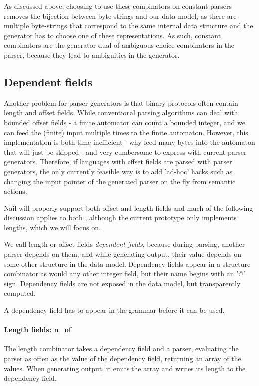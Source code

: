 As discussed above, choosing to use these combinators on constant parsers
removes the bijection between byte-strings and our data model, as there are
multiple byte-strings that correspond to the same internal data structure and
the generator has to choose one of these representations. As such, constant
combinators are the generator dual of ambiguous choice combinators in the
parser, because they lead to ambiguities in the generator.


\subsection{Dependent fields}
Another problem for parser generators is that binary protocols often contain
length and offset fields. While conventional parsing algorithms can deal with
bounded offset fields - a finite automaton can count a bounded integer, and we
can feed the (finite) input multiple times to the finite automaton. However,
this implementation is both time-inefficient - why feed many bytes into the
automaton that will just be skipped - and very cumbersome to express with
current parser generators. Therefore, if languages with offset fields are parsed
with parser generators, the only currently feasible way is to add 'ad-hoc' hacks
such as changing the input pointer of the generated parser on the fly from
semantic actions.

Nail will properly support both offset and length fields and much of the
following discussion applies to both , although the current prototype only
implements lengths, which we will focus on.

We call length or offset fields \textit{dependent fields}, because during
parsing, another parser depends on them, and while generating output, their
value depends on some other structure in the data model. Dependency fields
appear in a structure combinator as would any other integer field, but their
name begins with an '@' sign. Dependency fields are not exposed in the data
model, but transparently computed.

A dependency field has to appear in the grammar before it can be used. 
\paragraph{Length fields: n_of}
The length combinator takes a dependency field and a parser, evaluating the
parser as often as the value of the dependency field, returning an array of the
values. When generating output, it emits the array and writes its length to the
dependency field.
